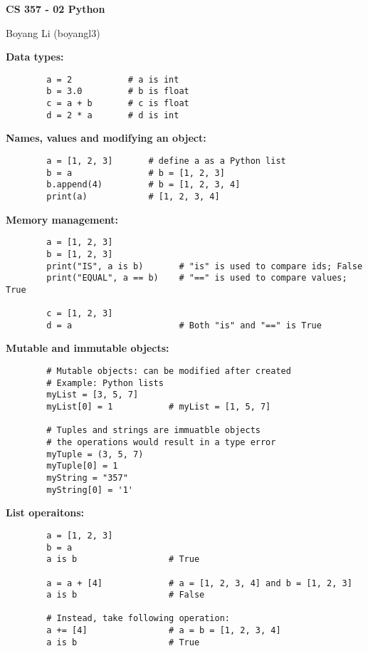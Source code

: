 \documentclass[12pt]{article}
\begin{document}
\begin{center}\Large\bf 
CS 357 - 02 Python\\
\end{center}
\begin{center}
Boyang Li (boyangl3)
\end{center}

\medskip
\noindent \textbf{Data types:}
    \begin{verbatim}
        a = 2           # a is int
        b = 3.0         # b is float
        c = a + b       # c is float
        d = 2 * a       # d is int
    \end{verbatim}

\medskip
\noindent \textbf{Names, values and modifying an object:}
    \begin{verbatim}
        a = [1, 2, 3]       # define a as a Python list
        b = a               # b = [1, 2, 3]
        b.append(4)         # b = [1, 2, 3, 4]
        print(a)            # [1, 2, 3, 4]
    \end{verbatim} 

\medskip
\noindent \textbf{Memory management:}
    \begin{verbatim}
        a = [1, 2, 3]
        b = [1, 2, 3]
        print("IS", a is b)       # "is" is used to compare ids; False
        print("EQUAL", a == b)    # "==" is used to compare values; True
        
        c = [1, 2, 3]
        d = a                     # Both "is" and "==" is True
    \end{verbatim}

\medskip
\noindent \textbf{Mutable and immutable objects:}
    \begin{verbatim}
        # Mutable objects: can be modified after created
        # Example: Python lists
        myList = [3, 5, 7]
        myList[0] = 1           # myList = [1, 5, 7]

        # Tuples and strings are immuatble objects
        # the operations would result in a type error
        myTuple = (3, 5, 7)
        myTuple[0] = 1
        myString = "357"
        myString[0] = '1'
    \end{verbatim}

\newpage
\noindent \textbf{List operaitons:}
    \begin{verbatim}
        a = [1, 2, 3]
        b = a
        a is b                  # True

        a = a + [4]             # a = [1, 2, 3, 4] and b = [1, 2, 3]
        a is b                  # False

        # Instead, take following operation:
        a += [4]                # a = b = [1, 2, 3, 4]
        a is b                  # True
    \end{verbatim}
\end{document}
